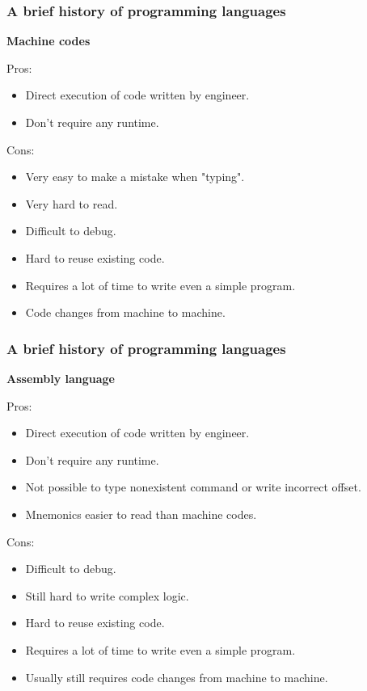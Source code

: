 \documentclass[aspectratio=1610,t]{beamer}
\begin{document}

\begin{frame}
\frametitle{A brief history of programming languages}
\textbf{Machine codes}

Pros:
\begin{itemize}
    \item Direct execution of code written by engineer.
    \item Don't require any runtime.
\end{itemize}

Cons:
\begin{itemize}
    \item Very easy to make a mistake when "typing".
    \item Very hard to read.
    \item Difficult to debug.
    \item Hard to reuse existing code.
    \item Requires a lot of time to write even a simple program.
    \item Code changes from machine to machine.
\end{itemize}
\end{frame}


\begin{frame}
\frametitle{A brief history of programming languages}
\textbf{Assembly language}

Pros:
\begin{itemize}
    \item Direct execution of code written by engineer.
    \item Don't require any runtime.
    \item Not possible to type nonexistent command or write incorrect offset.
    \item Mnemonics easier to read than machine codes.
\end{itemize}

Cons:
\begin{itemize}
    \item Difficult to debug.
    \item Still hard to write complex logic.
    \item Hard to reuse existing code.
    \item Requires a lot of time to write even a simple program.
    \item Usually still requires code changes from machine to machine.
\end{itemize}
\end{frame}
\end{document}
